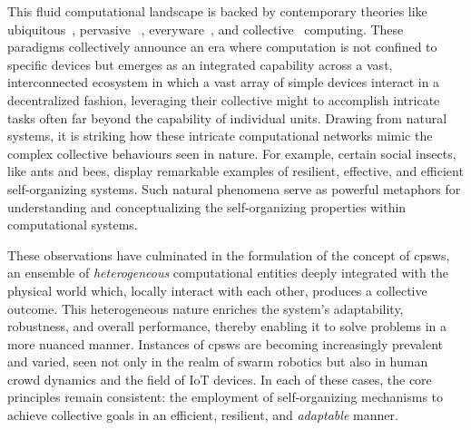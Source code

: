 \begin{refsection}
This fluid computational landscape is backed by contemporary theories like  ubiquitous~\cite{ubiquitous}, pervasive
 ~\cite{DBLP:journals/computer/SahaM03}, everyware~\cite{greenfield2010everyware}, and collective~\cite{DBLP:journals/computer/Abowd16} computing.
%
These paradigms collectively announce an era where computation 
 is not confined to specific devices but emerges as an integrated capability across a vast, 
 interconnected ecosystem in which a vast array of simple devices interact in a decentralized fashion, 
 leveraging their collective might to accomplish intricate tasks often far beyond the capability of individual units. 
%
Drawing from natural systems, 
 it is striking how these intricate computational networks mimic the complex collective behaviours seen in nature. 
 For example, certain social insects, like ants and bees, display remarkable examples of resilient, effective, and efficient self-organizing systems. 
 Such natural phenomena serve as powerful metaphors for understanding and conceptualizing the self-organizing properties within computational systems.
 
These observations have culminated in the formulation of the concept of \acp{cpsw}, 
 an ensemble of \emph{heterogeneous} computational entities deeply integrated with the physical world which, locally interact with each other, produces a collective outcome. %
 This heterogeneous nature enriches the system's adaptability, robustness, and overall performance, thereby enabling it to solve problems in a more nuanced manner.
%
Instances of \acp{cpsw} are becoming increasingly prevalent and varied, 
 seen not only in the realm of swarm robotics but also in human crowd dynamics and the field of IoT devices. 
 In each of these cases, the core principles remain consistent: the employment of self-organizing mechanisms to achieve collective goals in an efficient, resilient, and \emph{adaptable} manner.


\end{refsection}
